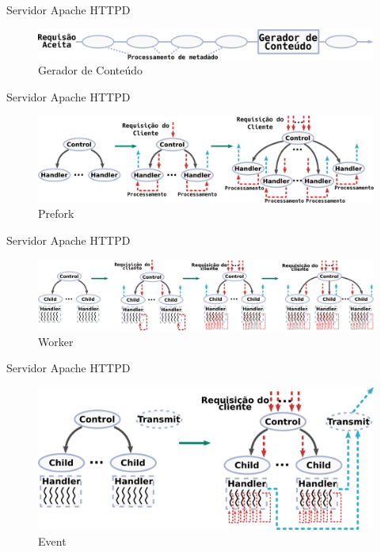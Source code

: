 \documentclass[xcolor={usenames,svgnames,dvipsnames},brazil,english,12pt,aspectratio=149]{beamer}
\begin{document}
\begin{frame}{Servidor Apache HTTPD}
  \begin{figure}[!h]
    \centering
    \includegraphics[width=.9\textwidth]{request_phases} 
    \caption{Gerador de Conteúdo}
    \label{fig:content_generator} 
  \end{figure}
\end{frame}

\begin{frame}{Servidor Apache HTTPD}
  \begin{figure}[!h]
    \centering
    \includegraphics[width=\textwidth]{prefork} 
    \caption{Prefork}
    \label{fig:prefork} 
  \end{figure}
\end{frame}

\begin{frame}{Servidor Apache HTTPD}
  \begin{figure}[!h]
    \centering
    \includegraphics[width=\textwidth]{worker} 
    \caption{Worker}
    \label{fig:worker} 
  \end{figure}
\end{frame}

\begin{frame}{Servidor Apache HTTPD}
  \begin{figure}[!h]
    \centering
    \includegraphics[width=.7\textwidth]{event} 
    \caption{Event}
    \label{fig:event} 
  \end{figure}
\end{frame}
\end{document}
